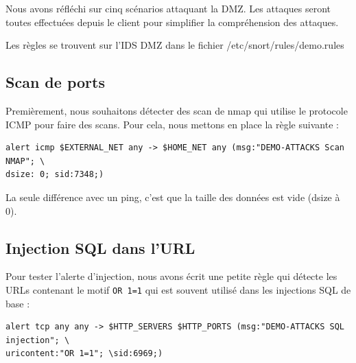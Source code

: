 \documentclass[a4paper,11pt,french]{article}
\begin{document}
\begin{center}
\end{center}

Nous avons réfléchi sur cinq scénarios attaquant la DMZ. Les attaques seront toutes effectuées depuis le client pour simplifier la compréhension des attaques.

Les règles se trouvent sur l'IDS DMZ dans le fichier /etc/snort/rules/demo.rules

\subsection{Scan de ports}

Premièrement, nous souhaitons détecter des scan de nmap qui utilise le protocole ICMP pour faire des scans. Pour cela, nous mettons en place la règle suivante :

\begin{Verbatim}
alert icmp $EXTERNAL_NET any -> $HOME_NET any (msg:"DEMO-ATTACKS Scan NMAP"; \
dsize: 0; sid:7348;)
\end{Verbatim}

La seule différence avec un ping, c'est que la taille des données est vide (dsize à 0).

\newpage
\subsection{Injection SQL dans l'URL}

Pour tester l'alerte d'injection, nous avons écrit une petite règle qui détecte les URLs contenant le motif \verb+OR 1=1+ qui est souvent utilisé dans les injections SQL de base :

\begin{Verbatim}
alert tcp any any -> $HTTP_SERVERS $HTTP_PORTS (msg:"DEMO-ATTACKS SQL injection"; \
uricontent:"OR 1=1"; \sid:6969;)
\end{Verbatim}
\end{document}
